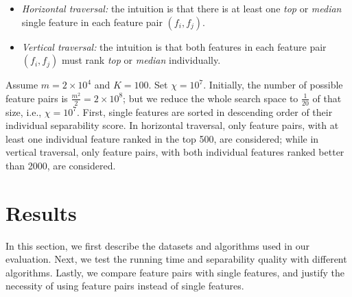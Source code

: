 \begin{itemize}
\item \emph{Horizontal traversal:} the intuition is that there is at least one {\em top} or {\em median} single feature in each \topk feature pair $(f_i,f_j)$.
\item \emph{Vertical traversal:}  the intuition is that both features in each \topk feature pair $(f_i,f_j)$ must rank {\em top} or {\em median} individually.
\end{itemize}



\begin{example}[\traversal]
Assume $m=2\times 10^4$ and $K=100$. Set $\chi=10^7$. Initially, the number of possible feature pairs is $\frac{m^2}{2}=2\times 10^8$; but we reduce the whole search space to  $\frac{1}{20}$ of that size,  i.e., $\chi=10^7$. First, single features are sorted in descending order of their individual separability score. In horizontal traversal, only feature pairs, with at least one individual feature ranked in the top 500, are considered; while in vertical traversal, only feature pairs, with both individual features ranked better than 2000, are considered.
\end{example}



\section{Results}
\label{sec:exp}
In this section, we first describe the datasets and algorithms used in our evaluation. Next, we test the running time and separability quality with different algorithms. Lastly, we compare \topk feature pairs with \topk single features, and justify the necessity of using feature pairs instead of single features.
